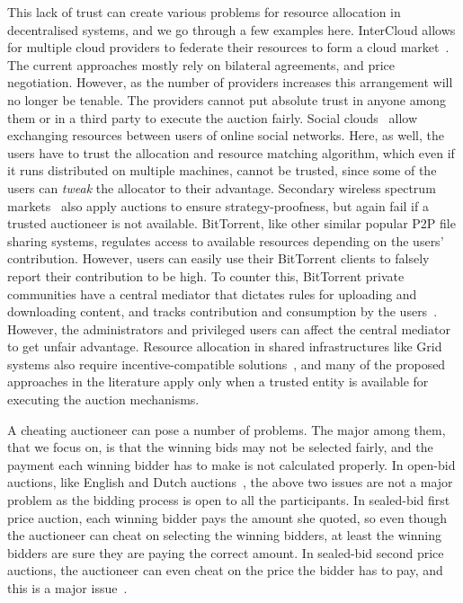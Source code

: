 This lack of trust can create various problems for resource allocation in decentralised systems, 
and we go through a few examples here.
InterCloud allows for multiple cloud providers to federate their resources 
to form a cloud market~\cite{Grozev2014}.
The current approaches mostly rely on bilateral agreements, and price negotiation.
However, as the number of providers increases this arrangement
will no longer be tenable.
The providers cannot put absolute trust in anyone among them
or in a third party to execute the auction fairly.
%
Social clouds~\cite{Caton2014} allow exchanging resources between users of online social networks.
Here, as well, the users have to trust the allocation and resource matching algorithm,
which even if it runs distributed on multiple machines,
cannot be trusted, since some of the users can \emph{tweak} the allocator to their advantage.
%
Secondary wireless spectrum markets~\cite{Zhou2008, Zhu2012} also apply auctions to ensure
strategy-proofness, but again fail if a trusted auctioneer is not available.
%
BitTorrent, like other similar popular P2P file sharing systems,
regulates access to available resources depending on the users' contribution.
However, users can easily use their BitTorrent clients to falsely report their contribution to be high.
To counter this, BitTorrent private communities have a central mediator
that dictates rules for uploading and downloading content, 
and tracks contribution and consumption by the users~\cite{Liu2010}.
However, the administrators and privileged users can affect the central
mediator to get unfair advantage.
%
Resource allocation in shared infrastructures like Grid systems also require incentive-compatible 
solutions~\cite{Lai2004, Khan2006Noncooperative, Buyya2002Economic}, %
and many of the proposed approaches in the literature apply only 
when a trusted entity is available for executing the auction mechanisms.

A cheating auctioneer can pose a number of problems.
The major among them, that we focus on, is that the winning bids may not be selected fairly,
and the payment each winning bidder has to make is not calculated properly.
In open-bid auctions, like English and Dutch auctions~\cite{Krishna2009},
the above two issues are not a major problem as the bidding process is open to all the participants.
In sealed-bid first price auction, each winning bidder pays the amount she quoted,
so even though the auctioneer can cheat on selecting the winning bidders,
at least the winning bidders are sure they are paying the correct amount.
In sealed-bid second price auctions, the auctioneer can even cheat 
on the price the bidder has to pay, and this is a major issue~\cite{Sandholm2000}.

